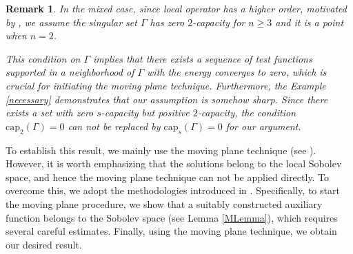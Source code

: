 \documentclass[11pt, notitlepage]{article}
\newtheorem{Remark}[Theorem]{Remark}
\begin{document}
{\begin{Remark}
      In the mixed case, since local operator has a higher order, motivated by \cite[Theorem 1.3]{SciunziJDE18}, we assume the singular set $\Gamma$ has zero $2$-capacity for $n\geq 3$ and it is a point when $n=2$. 
      
    This condition on $\Gamma$ implies that there exists a sequence of test functions supported in a neighborhood of $\Gamma$ with the energy converges to zero, which is crucial for initiating the moving plane technique. Furthermore, the Example \ref{necessary} demonstrates that our assumption is somehow sharp. Since there exists a set with zero $s$-capacity but positive $2$-capacity, the condition $\mathrm{cap}_2(\Gamma)=0$ can not be replaced by $\mathrm{cap}_s(\Gamma)=0$ for our argument. 
  \end{Remark}
To establish this result, we mainly use the moving plane technique (see \cite{BV21}). However, it is worth emphasizing that the solutions belong to the local Sobolev space, and hence the moving plane technique can not be applied directly. To overcome this, we adopt the methodologies introduced in \cite{SciunziJDE18, Luigi18}. Specifically, to start the moving plane procedure, we show that a suitably constructed auxiliary function belongs to the Sobolev space (see Lemma \ref{MLemma}), which requires several careful estimates. Finally, using the moving plane technique, we obtain our desired result.

}
\end{document}
